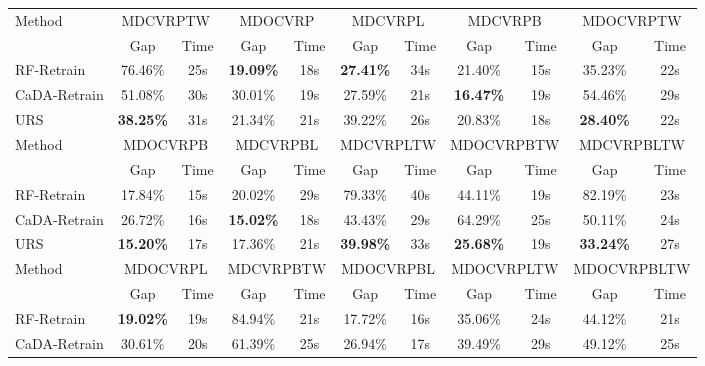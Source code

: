 \documentclass{article}
\theoremstyle{plain}
\theoremstyle{definition}
\theoremstyle{remark}
\begin{document}
\begin{table}[htbp]
{\begin{tabular}{l|cc|cc|cc|cc|cc}
    \midrule
    \multirow{2}[2]{*}{Method} & \multicolumn{2}{c|}{MDCVRPTW} & \multicolumn{2}{c|}{MDOCVRP} & \multicolumn{2}{c|}{MDCVRPL} & \multicolumn{2}{c|}{MDCVRPB} & \multicolumn{2}{c}{MDOCVRPTW} \\
          & Gap   & Time  & Gap   & Time  & Gap   & Time  & Gap   & Time  & Gap   & Time \\
    \midrule
    RF-Retrain & 76.46\% & 25s   & \cellcolor[HTML]{D0CECE}\textbf{19.09\%} & 18s   & \cellcolor[HTML]{D0CECE}\textbf{27.41\%} & 34s   & 21.40\% & 15s   & 35.23\% & 22s \\
    CaDA-Retrain & 51.08\% & 30s   & 30.01\% & 19s   & 27.59\% & 21s   & \cellcolor[HTML]{D0CECE}\textbf{16.47\%} & 19s   & 54.46\% & 29s \\
    URS & \cellcolor[HTML]{D0CECE}\textbf{38.25\%} & 31s   & 21.34\% & 21s   & 39.22\% & 26s   & 20.83\% & 18s   & \cellcolor[HTML]{D0CECE}\textbf{28.40\%} & 22s \\
    \midrule
    \midrule
    \multirow{2}[2]{*}{Method} & \multicolumn{2}{c|}{MDOCVRPB} & \multicolumn{2}{c|}{MDCVRPBL} & \multicolumn{2}{c|}{MDCVRPLTW} & \multicolumn{2}{c|}{MDOCVRPBTW} & \multicolumn{2}{c}{MDCVRPBLTW} \\
          & Gap   & Time  & Gap   & Time  & Gap   & Time  & Gap   & Time  & Gap   & Time \\
    \midrule
    RF-Retrain & 17.84\% & 15s   & 20.02\% & 29s   & 79.33\% & 40s   & 44.11\% & 19s   & 82.19\% & 23s \\
    CaDA-Retrain & 26.72\% & 16s   & \cellcolor[HTML]{D0CECE}\textbf{15.02\%} & 18s   & 43.43\% & 29s   & 64.29\% & 25s   & 50.11\% & 24s \\
    URS & \cellcolor[HTML]{D0CECE}\textbf{15.20\%} & 17s   & 17.36\% & 21s   & \cellcolor[HTML]{D0CECE}\textbf{39.98\%} & 33s   & \cellcolor[HTML]{D0CECE}\textbf{25.68\%} & 19s   & \cellcolor[HTML]{D0CECE}\textbf{33.24\%} & 27s \\
    \midrule
    \midrule
    \multirow{2}[2]{*}{Method} & \multicolumn{2}{c|}{MDOCVRPL} & \multicolumn{2}{c|}{MDCVRPBTW} & \multicolumn{2}{c|}{MDOCVRPBL} & \multicolumn{2}{c|}{MDOCVRPLTW} & \multicolumn{2}{c}{MDOCVRPBLTW} \\
          & Gap   & Time  & Gap   & Time  & Gap   & Time  & Gap   & Time  & Gap   & Time \\
    \midrule
    RF-Retrain & \cellcolor[HTML]{D0CECE}\textbf{19.02\%} & 19s   & 84.94\% & 21s   & 17.72\% & 16s   & 35.06\% & 24s   & 44.12\% & 21s \\
    CaDA-Retrain & 30.61\% & 20s   & 61.39\% & 25s   & 26.94\% & 17s   & 39.49\% & 29s   & 49.12\% & 25s \\

\end{tabular}}
\end{table}
\end{document}

